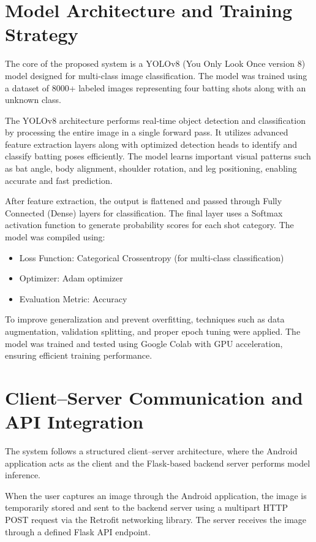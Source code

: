 \section{Model Architecture and Training Strategy} \label{S4.9}
The core of the proposed system is a YOLOv8 (You Only Look Once version 8) model designed for multi-class image classification. The model was trained using a dataset of 8000+ labeled images representing four batting shots along with an unknown class.

The YOLOv8 architecture performs real-time object detection and classification by processing the entire image in a single forward pass. It utilizes advanced feature extraction layers along with optimized detection heads to identify and classify batting poses efficiently. The model learns important visual patterns such as bat angle, body alignment, shoulder rotation, and leg positioning, enabling accurate and fast prediction.

After feature extraction, the output is flattened and passed through Fully Connected (Dense) layers for classification. The final layer uses a Softmax activation function to generate probability scores for each shot category. The model was compiled using:
\begin{itemize}
	\item Loss Function: Categorical Crossentropy (for multi-class classification)
    \item Optimizer: Adam optimizer
    \item Evaluation Metric: Accuracy
\end{itemize}
To improve generalization and prevent overfitting, techniques such as data augmentation, validation splitting, and proper epoch tuning were applied. The model was trained and tested using Google Colab with GPU acceleration, ensuring efficient training performance.

\section{Client–Server Communication and API Integration} \label{S4.10}
The system follows a structured client–server architecture, where the Android application acts as the client and the Flask-based backend server performs model inference.

When the user captures an image through the Android application, the image is temporarily stored and sent to the backend server using a multipart HTTP POST request via the Retrofit networking library. The server receives the image through a defined Flask API endpoint.

